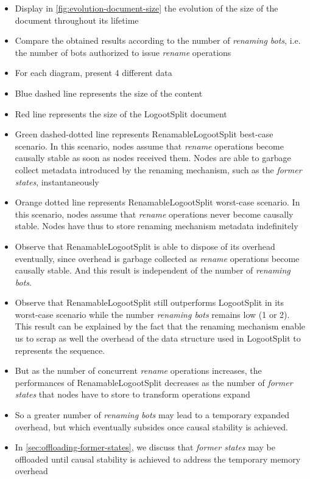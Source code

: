 \documentclass[sigplan,10pt]{acmart}
\newcommand{\ie}{i.e. }
\begin{document}
\begin{itemize}
    \item Display in \autoref{fig:evolution-document-size} the evolution of the size of the document throughout its lifetime
    \item Compare the obtained results according to the number of \emph{renaming bots}, \ie the number of bots authorized to issue \emph{rename} operations
    \item For each diagram, present 4 different data
    \item Blue dashed line represents the size of the content
    \item Red line represents the size of the LogootSplit document
    \item Green dashed-dotted line represents RenamableLogootSplit best-case scenario. In this scenario, nodes assume that \emph{rename} operations become causally stable as soon as nodes received them. Nodes are able to garbage collect metadata introduced by the renaming mechanism, such as the \emph{former states}, instantaneously
    \item Orange dotted line represents RenamableLogootSplit worst-case scenario. In this scenario, nodes assume that \emph{rename} operations never become causally stable. Nodes have thus to store renaming mechanism metadata indefinitely
    \item Observe that RenamableLogootSplit is able to dispose of its overhead eventually, since overhead is garbage collected as \emph{rename} operations become causally stable. And this result is independent of the number of \emph{renaming bots}.
    \item Observe that RenamableLogootSplit still outperforms LogootSplit in its worst-case scenario while the number \emph{renaming bots} remains low (1 or 2). This result can be explained by the fact that the renaming mechanism enable us to scrap as well the overhead of the data structure used in LogootSplit to represents the sequence.
    \item But as the number of concurrent \emph{rename} operations increases, the performances of RenamableLogootSplit decreases as the number of \emph{former states} that nodes have to store to transform operations expand
    \item So a greater number of \emph{renaming bots} may lead to a temporary expanded overhead, but which eventually subsides once causal stability is achieved.
    \item In \autoref{sec:offloading-former-states}, we discuss that \emph{former states} may be offloaded until causal stability is achieved to address the temporary memory overhead
\end{itemize}
\end{document}
